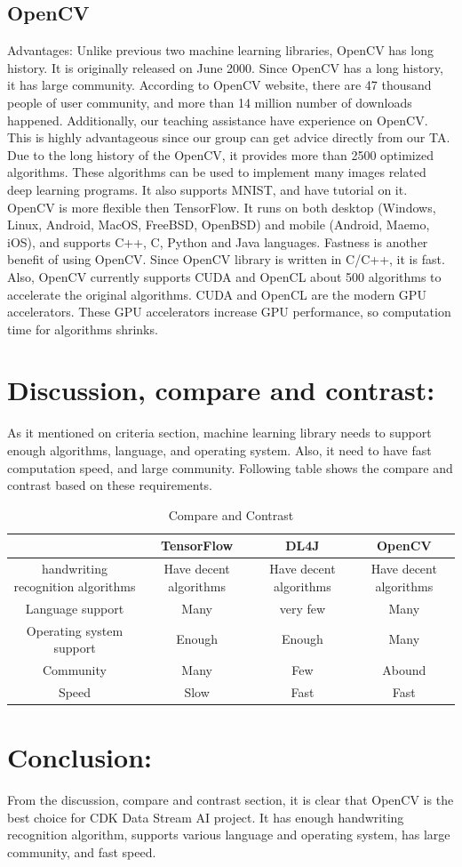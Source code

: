 \documentclass[onecolumn, draftclsnofoot,10pt, compsoc]{IEEEtran}
\begin{document}
\subsection{OpenCV}
 Advantages: Unlike previous two machine learning libraries, OpenCV has long history. It is originally released on June 2000. Since OpenCV has a long history, it has large community. According to OpenCV website, there are 47 thousand people of user community, and more than 14 million number of downloads happened. Additionally, our teaching assistance have experience on OpenCV. This is highly advantageous since our group can get advice directly from our TA.
Due to the long history of the OpenCV, it provides more than 2500 optimized algorithms. These algorithms can be used to implement many images related deep learning programs. It also supports MNIST, and have tutorial on it.
OpenCV is more flexible then TensorFlow. It runs on both desktop (Windows, Linux, Android, MacOS, FreeBSD, OpenBSD) and mobile (Android, Maemo, iOS), and supports C++, C, Python and Java languages.
Fastness is another benefit of using OpenCV. Since OpenCV library is written in C/C++, it is fast. Also, OpenCV currently supports CUDA and OpenCL about 500 algorithms to accelerate the original algorithms. CUDA and OpenCL are the modern GPU accelerators. These GPU accelerators increase GPU performance, so computation time for algorithms shrinks.


\section{Discussion, compare and contrast:}
As it mentioned on criteria section, machine learning library needs to support enough algorithms, language, and operating system. Also, it need to have fast computation speed, and large community. Following table shows the compare and contrast based on these requirements.

\begin{table}[h]
\centering
\begin{tabular}{ | c | c | c | c |}
\hline
 & TensorFlow & DL4J & OpenCV\\ 
\hline
handwriting recognition algorithms & Have decent algorithms & Have decent algorithms & Have decent algorithms \\ 
\hline
Language support & Many & very few & Many\\ 
\hline
Operating system support & Enough & Enough & Many\\ 
\hline
Community & Many & Few & Abound\\ 
\hline  
Speed & Slow & Fast & Fast\\ 
\hline  
\end{tabular}
\caption{Compare and Contrast}
\label{table:1}
\end{table}

\section{Conclusion:}
From the discussion, compare and contrast section, it is clear that OpenCV is the best choice for CDK Data Stream AI project. It has enough handwriting recognition algorithm, supports various language and operating system, has large community, and fast speed.
\end{document}
